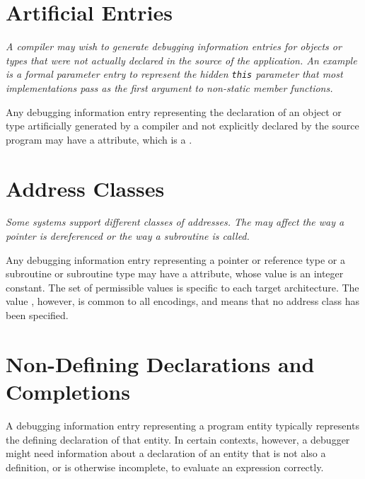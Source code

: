 \section{Artificial Entries}
\label{chap:artificialentries}
\textit{A compiler may wish to generate debugging information entries
for objects or types that were not actually declared in the
source of the application. An example is a formal parameter
entry to represent the hidden
\texttt{this} parameter
that most  implementations pass as the first argument
to non-static member functions.}

Any debugging information entry representing the
declaration of an object or type artificially generated by
a compiler and not explicitly declared by the source
program\hypertarget{chap:DWATartificialobjectsortypesthat}{}
may have a
\DWATartificialDEFN{} attribute,
which is a .

\bb
\section{Address Classes}
\label{chap:addressclasses}
\eb
\textit{Some systems support different classes of addresses.
The  may affect the way a pointer
is dereferenced or the way a subroutine is called.}

Any debugging information entry representing a pointer or
reference type or a subroutine or subroutine type may
have a \DWATaddressclass{}
attribute, whose value is an integer
constant.  The set of permissible values is specific to
each target architecture. The value \DWADDRnoneTARG, however,
is common to all encodings, and means that no address class
has been specified.

\db

\section{Non-Defining Declarations and Completions}
\label{chap:nondefiningdeclarationsandcompletions}
A debugging information entry representing a program entity
typically represents the defining declaration of that
entity. In certain contexts, however, a debugger might need
information about a declaration of an entity that is not
also a definition, or is otherwise incomplete, to evaluate
an\hypertarget{chap:DWATdeclarationincompletenondefiningorseparateentitydeclaration}{}
expression correctly.

